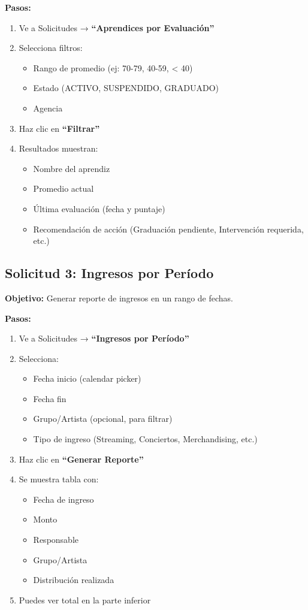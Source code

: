 \documentclass[12pt,a4paper,spanish,oneside]{report}
\begin{document}
\textbf{Pasos:}
\begin{enumerate}
\item Ve a Solicitudes → \textbf{``Aprendices por Evaluación''}
\item Selecciona filtros:
\begin{itemize}
\item Rango de promedio (ej: 70-79, 40-59, < 40)
\item Estado (ACTIVO, SUSPENDIDO, GRADUADO)
\item Agencia
\end{itemize}
\item Haz clic en \textbf{``Filtrar''}
\item Resultados muestran:
\begin{itemize}
\item Nombre del aprendiz
\item Promedio actual
\item Última evaluación (fecha y puntaje)
\item Recomendación de acción (Graduación pendiente, Intervención requerida, etc.)
\end{itemize}
\end{enumerate}

\subsection{Solicitud 3: Ingresos por Período}

\textbf{Objetivo:} Generar reporte de ingresos en un rango de fechas.

\textbf{Pasos:}
\begin{enumerate}
\item Ve a Solicitudes → \textbf{``Ingresos por Período''}
\item Selecciona:
\begin{itemize}
\item Fecha inicio (calendar picker)
\item Fecha fin
\item Grupo/Artista (opcional, para filtrar)
\item Tipo de ingreso (Streaming, Conciertos, Merchandising, etc.)
\end{itemize}
\item Haz clic en \textbf{``Generar Reporte''}
\item Se muestra tabla con:
\begin{itemize}
\item Fecha de ingreso
\item Monto
\item Responsable
\item Grupo/Artista
\item Distribución realizada
\end{itemize}
\item Puedes ver total en la parte inferior
\end{enumerate}
\end{document}
